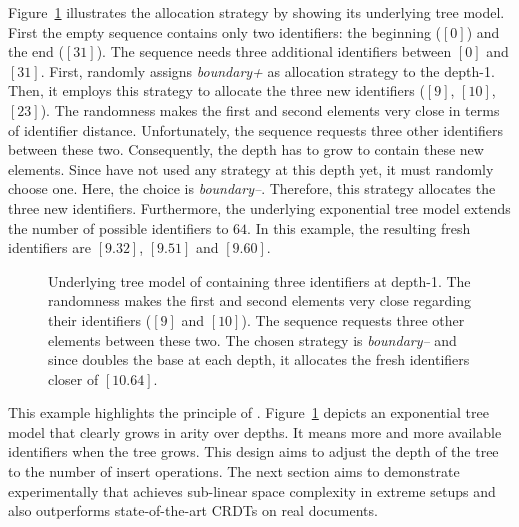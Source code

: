 Figure~\ref{fig:lseqtreeexample} illustrates the allocation strategy \NAME{} by
showing its underlying tree model. First the empty sequence contains only two
identifiers: the beginning ($[0]$) and the end ($[31]$). The sequence needs
three additional identifiers between $[0]$ and $[31]$. First, \NAME{} randomly
assigns \emph{boundary+} as allocation strategy to the depth-1. Then, it
employs this strategy to allocate the three new identifiers ($[9]$, $[10]$,
$[23]$). The randomness makes the first and second elements very close in terms
of identifier distance.  Unfortunately, the sequence requests three other
identifiers between these two. Consequently, the depth has to grow to contain
these new elements. Since \NAME{} have not used any strategy at this depth yet,
it must randomly choose one. Here, the choice is \emph{boundary--}. Therefore,
this strategy allocates the three new identifiers. Furthermore, the underlying
exponential tree model extends the number of possible identifiers to $64$. In
this example, the resulting fresh identifiers are $[9.32]$, $[9.51]$ and
$[9.60]$.

\begin{figure}[h]
\addtolength{\belowcaptionskip}{-10pt}
\begin{center}

\caption{Underlying tree model of \NAME{} containing three identifiers at
  depth-1. The randomness makes the first and second elements very close
  regarding their identifiers ($[9]$ and $[10]$). The sequence requests three
  other elements between these two. The chosen strategy is \emph{boundary--}
  and since \NAME{} doubles the base at each depth, it allocates the fresh
  identifiers closer of $[10.64]$.}
\label{fig:lseqtreeexample}
\end{center}
\end{figure}

This example highlights the principle of \NAME{}.
Figure~\ref{fig:lseqtreeexample} depicts an exponential tree model that clearly
grows in arity over depths. It means more and more available identifiers when
the tree grows. This design aims to adjust the depth of the tree to the number
of insert operations. The next section aims to demonstrate experimentally that
\NAME{} achieves sub-linear space complexity in extreme setups and also
outperforms state-of-the-art CRDTs on real documents.

